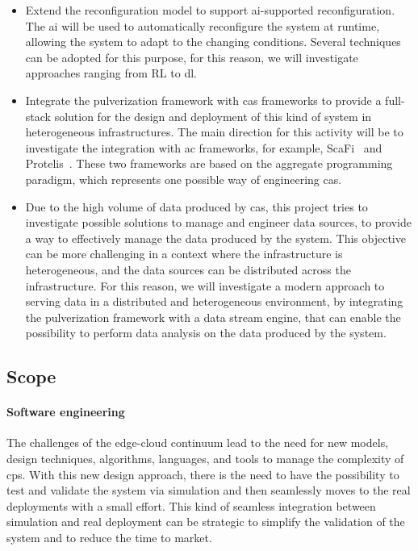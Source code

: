 \documentclass[12pt]{article}
\begin{document}
\begin{itemize}
	\item Extend the reconfiguration model to support \ac{ai}-supported reconfiguration.
		The \ac{ai} will be used to automatically reconfigure the system at runtime,
		allowing the system to adapt to the changing conditions.
		Several techniques can be adopted for this purpose,
		for this reason,
		we will investigate approaches ranging from RL to \ac{dl}.
	\item Integrate the pulverization framework with \ac{cas} frameworks to provide a full-stack solution for the design and deployment of this kind of system in heterogeneous infrastructures.
		The main direction for this activity will be to investigate the integration with \ac{ac} frameworks,
		for example,
		ScaFi~\cite{DBLP:journals/softx/CasadeiVAP22} and Protelis~\cite{DBLP:conf/sac/PianiniVB15}.
		These two frameworks are based on the aggregate programming paradigm,
		which represents one possible way of engineering \ac{cas}.
	\item Due to the high volume of data produced by \ac{cas},
		this project tries to investigate possible solutions to manage and engineer data sources,
		to provide a way to effectively manage the data produced by the system.
		This objective can be more challenging in a context where the infrastructure is heterogeneous,
		and the data sources can be distributed across the infrastructure.
		For this reason,
		we will investigate a modern approach to serving data in a distributed and heterogeneous environment,
		by integrating the pulverization framework with a data stream engine,
		that can enable the possibility to perform data analysis on the data produced by the system.
\end{itemize}

\subsection{Scope}\label{subsec:scope}

\paragraph{Software engineering}
The challenges of the edge-cloud continuum lead to the need for new models,
design techniques, algorithms, languages, and tools to manage the complexity
of \ac{cps}.
%
With this new design approach,
there is the need to have the possibility to test and validate the system via simulation
and then seamlessly moves to the real deployments with a small effort.
%
This kind of seamless integration between simulation and real deployment can be strategic
to simplify the validation of the system and to reduce the time to market.
\end{document}
